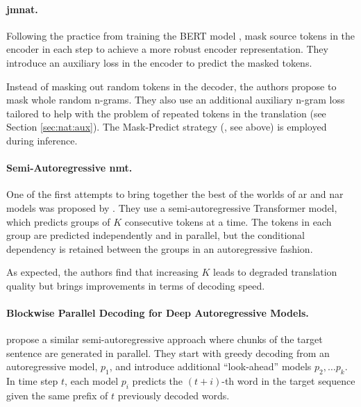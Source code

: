 \paragraph{\Acl{jmnat}.} Following the practice from training the BERT model
\citep{devlin-etal-2019-bert}, \citet{guo-etal-2020-jointly} mask source tokens
in the encoder in each step to achieve a more robust encoder
representation. They introduce an auxiliary loss in the encoder to predict the
masked tokens.

Instead of masking out random tokens in the decoder, the authors propose to
mask whole random n-grams. They also use an additional auxiliary n-gram loss
tailored to help with the problem of repeated tokens in the translation (see
Section \ref{sec:nat:aux}). The Mask-Predict strategy
(\citealp{ghazvininejad-etal-2019-mask}, see above) is employed during
inference.

\paragraph{Semi-Autoregressive \acs{nmt}.} One of the first attempts to bring
together the best of the worlds of \ac{ar} and \ac{nar} models was proposed by
\citet{wang-etal-2018-semi}. They use a semi-autoregressive Transformer model,
which predicts groups of $K$ consecutive tokens at a time. The tokens in each
group are predicted independently and in parallel, but the conditional
dependency is retained between the groups in an autoregressive fashion.

As expected, the authors find that increasing $K$ leads to degraded translation
quality but brings improvements in terms of decoding speed.

\paragraph{Blockwise Parallel Decoding for Deep Autoregressive Models.}
\citet{stern2018blockwise} propose a similar semi-autoregressive approach where
chunks of the target sentence are generated in parallel.
%
They start with greedy decoding from an autoregressive model, $p_1$, and
introduce additional ``look-ahead'' models $p_2, \ldots p_k$. In time step $t$,
each model $p_i$ predicts the $(t + i)$-th word in the target sequence given
the same prefix of $t$ previously decoded words.

